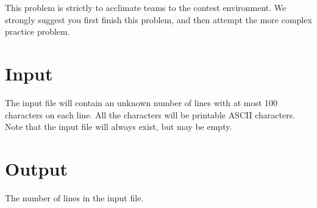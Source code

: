 

This problem is strictly to acclimate teams to the contest environment.  We strongly suggest you first finish this problem, and then attempt the more complex practice problem.

\section*{Input}

The input file will contain an unknown number of lines with at most 100 characters on each line.  All the characters will be printable ASCII characters.  Note that the input file will always exist, but may be empty.

\section*{Output}

The number of lines in the input file.
